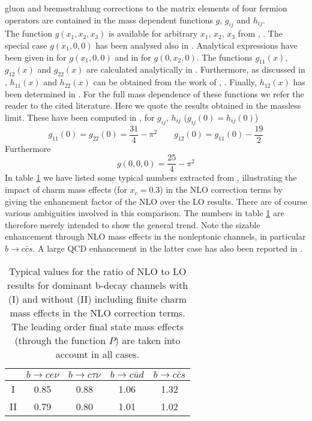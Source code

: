 gluon and bremsstrahlung corrections to the matrix elements of four
fermion operators are contained in the mass dependent functions $g$,
$g_{ij}$ and $h_{ij}$.
\\
The function $g(x_1,x_2,x_3)$ is available for arbitrary $x_1$, $x_2$,
$x_3$ from \cite{hokimpham:83}, \cite{hokimpham:84}. The special case
$g(x_1,0,0)$ has been analysed also in \cite{CM:78}. Analytical
expressions have been given in \cite{nir:89} for $g(x_1,0,0)$ and in
\cite{baganetal:94a} for $g(0,x_2,0)$.  The functions $g_{11}(x)$,
$g_{12}(x)$ and $g_{22}(x)$ are calculated analytically in
\cite{baganetal:94a}. Furthermore, as discussed in
\cite{baganetal:94a}, $h_{11}(x)$ and $h_{22}(x)$ can be obtained from
the work of \cite{hokimpham:83}, \cite{hokimpham:84}. Finally,
$h_{12}(x)$ has been determined in \cite{baganetal:95}.
For the full mass dependence of these functions we refer the
reader to the cited literature. Here we quote the results obtained in
the massless limit.  These have been computed in \cite{altarelli:81},
\cite{buchalla:93} for $g_{ij}$, $h_{ij}$ ($g_{ij}(0)=h_{ij}(0)$)
\begin{equation}\label{ghij0}
g_{11}(0)=g_{22}(0)=\frac{31}{4}-\pi^2
\qquad g_{12}(0)=g_{11}(0)-\frac{19}{2}
\end{equation}
Furthermore
\begin{equation}\label{g000}
g(0,0,0)=\frac{25}{4}-\pi^2
\end{equation}
In table \ref{tab:bNLOnum} we have listed some typical numbers
extracted from \cite{baganetal:94b}, \cite{baganetal:95} illustrating
the impact of charm mass effects (for $x_c=0.3$) in the NLO correction
terms by giving the enhancment factor of the NLO over the LO results.
There are of course various ambiguities involved in this comparison.
The numbers in table \ref{tab:bNLOnum} are therefore merely intended to
show the general trend.  Note the sizable enhancement through NLO mass
effects in the nonleptonic channels, in particular $b\to c\bar cs$. A
large QCD enhancement in the latter case has also been reported in
\cite{voloshin:94}.

\begin{table}[htb]
\caption[]{Typical values for the ratio of NLO to LO results for dominant
b-decay channels with (I) and without (II) including finite charm mass
effects in the NLO correction terms. The leading order final state mass
effects (through the function $P$) are taken into account in all
cases.
\label{tab:bNLOnum}}
\begin{center}
\begin{tabular}{|c||c|c|c|c|}
 & $b\to ce\nu$ & $b\to c\tau\nu$ & $b\to c\bar ud$ & $b\to c\bar cs$\\
\hline
I & 0.85 & 0.88 & 1.06 & 1.32 \\
\hline
II & 0.79 & 0.80 & 1.01 & 1.02
\end{tabular}
\end{center}
\end{table}

